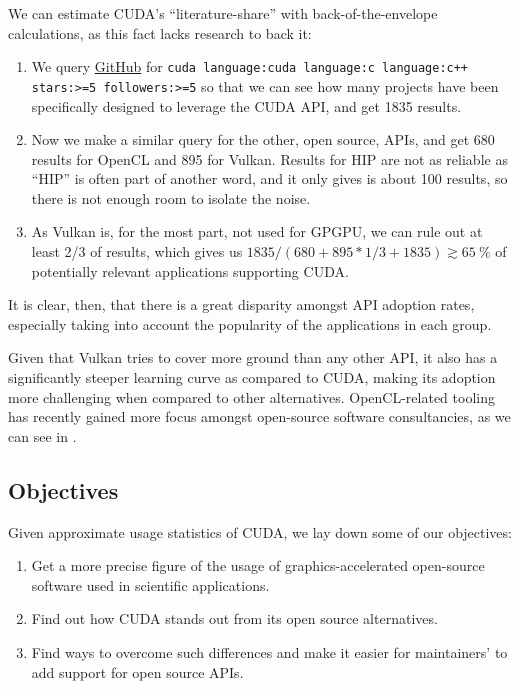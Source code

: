 \documentclass[conference, onecolumn]{IEEEtran}
\begin{document}

We can estimate CUDA's ``literature-share'' with back-of-the-envelope
calculations, as this fact lacks research to back it:

\begin{enumerate}
    \item We query \href{https://github.com}{GitHub} for
        \verb|cuda language:cuda language:c language:c++ stars:>=5 followers:>=5|
        so that we can see how many projects have been specifically designed to
        leverage the CUDA API, and get 1835 results.
    \item Now we make a similar query for the other, open source, APIs, and get
        680 results for OpenCL and 895 for Vulkan. Results for HIP are not as
        reliable as ``HIP'' is often part of another word, and it only gives is
        about 100 results, so there is not enough room to isolate the noise.
    \item As Vulkan is, for the most part, not used for GPGPU, we can rule out
        at least 2/3 of results, which gives us $ 1835 / (680 + 895 * 1/3 +
        1835) \gtrsim \qty{65}{\percent} $ of potentially relevant applications
        supporting CUDA.
\end{enumerate}

It is clear, then, that there is a great disparity amongst API adoption rates,
especially taking into account the popularity of the applications in each
group.

Given that Vulkan tries to cover more ground than any other API, it also has a
significantly steeper learning curve as compared to CUDA, making its adoption
more challenging when compared to other alternatives.
OpenCL-related tooling has recently gained more focus amongst open-source
software consultancies, as we can see in \cite{MachineL70:online}.

\subsection{Objectives} \label{sec:intro:objectives}

Given approximate usage statistics of CUDA, we lay down some of our objectives:

\begin{enumerate}
    \item\label{obj1} Get a more precise figure of the usage of
        graphics-accelerated open-source software used in scientific
        applications.
    \item\label{obj2} Find out how CUDA stands out from its open source
        alternatives.
    \item\label{obj3} Find ways to overcome such differences and make it easier
        for maintainers' to add support for open source APIs.
\end{enumerate}
\end{document}
